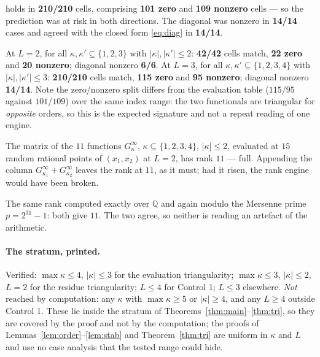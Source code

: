 \documentclass[11pt]{article}
\theoremstyle{definition}
\theoremstyle{remark}
\newcommand{\QQ}{\mathbb{Q}}
\newcommand{\Gi}[1]{G^{\infty}_{#1}}
\begin{document}
\begin{description}
  holds in \textbf{210/210} cells, comprising \textbf{101 zero} and \textbf{109 nonzero} cells
  --- so the prediction was at risk in both directions. The diagonal was nonzero in
  \textbf{14/14} cases and agreed with the closed form \eqref{eq:diag} in \textbf{14/14}.
\item[Main check: residue triangularity (Proposition~\ref{prop:res}).] At $L=2$, for all
  $\kappa,\kappa'\subseteq\{1,2,3\}$ with $|\kappa|,|\kappa'|\le2$: \textbf{42/42} cells match,
  \textbf{22 zero} and \textbf{20 nonzero}; diagonal nonzero \textbf{6/6}. At $L=3$, for all
  $\kappa,\kappa'\subseteq\{1,2,3,4\}$ with $|\kappa|,|\kappa'|\le3$: \textbf{210/210} cells
  match, \textbf{115 zero} and \textbf{95 nonzero}; diagonal nonzero \textbf{14/14}. Note the
  zero/nonzero split differs from the evaluation table ($115/95$ against $101/109$) over the
  same index range: the two functionals are triangular for \emph{opposite} orders, so this is
  the expected signature and not a repeat reading of one engine.
\item[Control 2 (planted dependency) --- \emph{fires correctly}.] The matrix of the $11$
  functions $\Gi\kappa$, $\kappa\subseteq\{1,2,3,4\}$, $|\kappa|\le2$, evaluated at $15$
  random rational points of $(x_1,x_2)$ at $L=2$, has rank $11$ --- full. Appending the column
  $\Gi{\kappa_1}+\Gi{\kappa_2}$ leaves the rank at $11$, as it must; had it risen, the rank
  engine would have been broken.
\item[Control 4 (two engines).] The same rank computed exactly over $\QQ$ and again modulo the
  Mersenne prime $p=2^{31}-1$: both give $11$. The two agree, so neither is reading an artefact
  of the arithmetic.
\end{description}

\paragraph{The stratum, printed.}
Verified: $\max\kappa\le4$, $|\kappa|\le3$ for the evaluation triangularity; $\max\kappa\le3$,
$|\kappa|\le2$, $L=2$ for the residue triangularity; $L\le4$ for Control 1; $L\le3$ elsewhere.
\emph{Not} reached by computation: any $\kappa$ with $\max\kappa\ge5$ or $|\kappa|\ge4$, and
any $L\ge4$ outside Control 1. These lie inside the stratum of
Theorems~\ref{thm:main}--\ref{thm:tri}, so they are covered by the proof and not by the
computation; the proofs of Lemmas~\ref{lem:order}--\ref{lem:stab} and Theorem~\ref{thm:tri} are
uniform in $\kappa$ and $L$ and use no case analysis that the tested range could hide.
\end{document}
